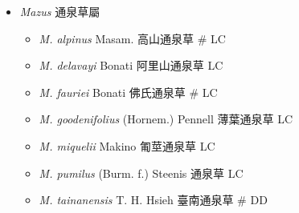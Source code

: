 
  \begin{itemize}
 \item[] \textit{Mazus} 通泉草屬
                                
  \begin{itemize}
        \item[] \textit{M. alpinus} Masam.  高山通泉草  \# LC
        \item[] \textit{M. delavayi} Bonati  阿里山通泉草   LC
        \item[] \textit{M. fauriei} Bonati  佛氏通泉草  \# LC
        \item[] \textit{M. goodenifolius} (Hornem.) Pennell  薄葉通泉草   LC
        \item[] \textit{M. miquelii} Makino  匍莖通泉草   LC
        \item[] \textit{M. pumilus} (Burm. f.) Steenis  通泉草   LC
        \item[] \textit{M. tainanensis} T. H. Hsieh  臺南通泉草  \# DD
  \end{itemize}
  \end{itemize}

